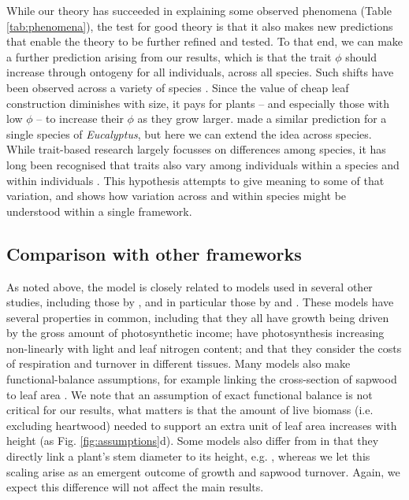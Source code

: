 \documentclass[a4paper,11pt]{article}
\begin{document}
While our theory has succeeded in explaining some observed phenomena (Table \ref{tab:phenomena}), the test for good theory is that it also makes new predictions that enable the theory to be further refined and tested. To that end, we can make a further prediction arising from our results, which is that the trait $\phi$ should increase through ontogeny for all individuals, across all species. Such shifts have been observed across a variety of species \citet{King-1999,Thomas-1999,Koch-2004}. Since the value of cheap leaf construction diminishes with size, it pays for plants -- and especially those with low $\phi$ -- to increase their $\phi$ as they grow larger. \citet{King-1999} made a similar prediction for a single species of \emph{Eucalyptus}, but here we can extend the idea across species. While trait-based research largely focusses on differences among species, it has long been recognised that traits also vary among individuals within a species and within individuals \citep{Westoby-2002}. This hypothesis attempts to give meaning to some of that variation, and shows how variation across and within species might be understood within a single framework.

\subsection{Comparison with other frameworks}

As noted above, the {\plant} model is closely related to models used in several other studies, including those by \citet{Givnish-1988, Yokozawa-1995, Makela-1997, King-1999, King-2005, Moorcroft-2001, Li-2014}, and in particular those by \citet{Makela-1997} and \citet{Moorcroft-2001}. These models have several properties in common, including that they all have growth being driven by the gross amount of photosynthetic income; have photosynthesis increasing non-linearly with light and leaf nitrogen content; and that they consider the costs of respiration and turnover in different tissues. Many models also make functional-balance assumptions, for example linking the cross-section of sapwood to leaf area \citep{Givnish-1988, Yokozawa-1995, Makela-1997, King-2005, Moorcroft-2001}. We note that an assumption of exact functional balance is not critical for our results, what matters is that the amount of live biomass (i.e. excluding heartwood) needed to support an extra unit of leaf area increases with height (as Fig. \ref{fig:assumptions}d). Some models also differ from in that they directly link a plant's stem diameter to its height, e.g. \citet{Yokozawa-1995, King-1999, Moorcroft-2001, Li-2014}, whereas we let this scaling arise as an emergent outcome of growth and sapwood turnover. Again, we expect this difference will not affect the main results.
\end{document}
